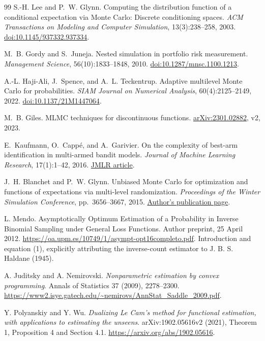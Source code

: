 \begin{thebibliography}{99}
S.-H. Lee and P.~W. Glynn.
\newblock Computing the distribution function of a conditional expectation
via Monte Carlo: Discrete conditioning spaces.
\newblock \emph{ACM Transactions on Modeling and Computer Simulation}, 13(3):238--258, 2003.
\newblock \href{https://doi.org/10.1145/937332.937334}{doi:10.1145/937332.937334}.

M.~B. Gordy and S.~Juneja.
\newblock Nested simulation in portfolio risk measurement.
\newblock \emph{Management Science}, 56(10):1833--1848, 2010.
\newblock \href{https://doi.org/10.1287/mnsc.1100.1213}{doi:10.1287/mnsc.1100.1213}.

A.-L. Haji-Ali, J.~Spence, and A.~L. Teckentrup.
\newblock Adaptive multilevel Monte Carlo for probabilities.
\newblock \emph{SIAM Journal on Numerical Analysis}, 60(4):2125--2149, 2022.
\newblock \href{https://doi.org/10.1137/21M1447064}{doi:10.1137/21M1447064}.

M.~B. Giles.
\newblock MLMC techniques for discontinuous functions.
\newblock \href{https://arxiv.org/abs/2301.02882}{arXiv:2301.02882}, v2, 2023.

E.~Kaufmann, O.~Capp\'e, and A.~Garivier.
\newblock On the complexity of best-arm identification in multi-armed bandit models.
\newblock \emph{Journal of Machine Learning Research}, 17(1):1--42, 2016.
\newblock \href{https://jmlr.org/papers/v17/kaufman16a.html}{JMLR article}.

J.~H. Blanchet and P.~W. Glynn.
\newblock Unbiased Monte Carlo for optimization and functions of expectations
via multi-level randomization.
\newblock \emph{Proceedings of the Winter Simulation Conference}, pp.~3656--3667, 2015.
\newblock \href{https://web.stanford.edu/~glynn/papers/2015/BlanchetG15.html}{Author's publication page}.

 L. Mendo. Asymptotically Optimum Estimation of a Probability in Inverse Binomial Sampling under General Loss Functions. Author preprint, 25 April 2012. \url{https://oa.upm.es/10749/1/asympt-opt16completo.pdf}. Introduction and equation (1), explicitly attributing the inverse-count estimator to J. B. S. Haldane (1945).

 A. Juditsky and A. Nemirovski.
\emph{Nonparametric estimation by convex programming}.
Annals of Statistics 37 (2009), 2278--2300.
\url{https://www2.isye.gatech.edu/~nemirovs/AnnStat_Saddle_2009.pdf}.

 Y. Polyanskiy and Y. Wu.
\emph{Dualizing Le Cam's method for functional estimation, with applications
to estimating the unseens}. arXiv:1902.05616v2 (2021), Theorem 1,
Proposition 4 and Section 4.1.
\url{https://arxiv.org/abs/1902.05616}.


\end{thebibliography}
